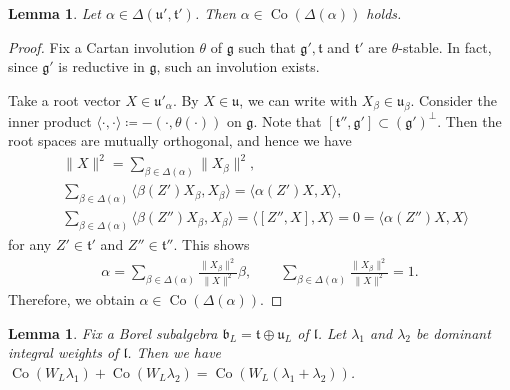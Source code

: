 \documentclass[pdftex]{sigma}
\numberwithin{equation}{section}
\newtheorem{Lemma}[Theorem]{Lemma}
\theoremstyle{definition}
\newcommand{\lie}[1]{\mathfrak{#1}}
\DeclareMathOperator{\Co}{\mathrm{Co}}
\begin{document}
\begin{Lemma}\label{lem:ConvexityRestriction}
	Let $\alpha \in \Delta(\lie{u'}, \lie{t'})$.
	Then $\alpha \in \Co(\Delta(\alpha))$ holds.
\end{Lemma}

\begin{proof}
	Fix a Cartan involution $\theta$ of $\lie{g}$ such that
	$\lie{g}', \lie{t}$ and $\lie{t}'$ are $\theta$-stable.
	In fact, since $\lie{g}'$ is reductive in $\lie{g}$, such an involution exists.

	Take a root vector $X \in \lie{u}'_{\alpha}$.
	By $X \in \lie{u}$, we can write  with $X_{\beta} \in \lie{u}_{\beta}$.
	Consider the inner product $\langle \cdot, \cdot \rangle \coloneq -(\cdot, \theta(\cdot))$ on $\lie{g}$.
	Note that $[\lie{t''}, \lie{g'}] \subset (\lie{g}')^\perp$.
	Then the root spaces are mutually orthogonal, and hence we have
	\begin{align*}
		&\|X\|^2= \sum_{\beta \in \Delta(\alpha)} \|X_\beta\|^2, \\
		&\sum_{\beta \in \Delta(\alpha)} \langle \beta(Z')X_\beta, X_\beta\rangle= \langle \alpha(Z')X, X\rangle, \\
		&\sum_{\beta \in \Delta(\alpha)} \langle \beta(Z'')X_\beta, X_\beta\rangle= \langle [Z'', X], X\rangle = 0 = \langle \alpha(Z'')X, X\rangle
	\end{align*}
	for any $Z' \in \lie{t'}$ and $Z'' \in \lie{t''}$.
	This shows
	\begin{align*}
		\alpha = \sum_{\beta \in \Delta(\alpha)} \frac{\|X_\beta\|^2}{\|X\|^2} \beta, \qquad \sum_{\beta \in \Delta(\alpha)} \frac{\|X_\beta\|^2}{\|X\|^2} = 1.
	\end{align*}
	Therefore, we obtain $\alpha \in \Co(\Delta(\alpha))$.
\end{proof}


\begin{Lemma}\label{lem:SumConvex}
	Fix a Borel subalgebra $\lie{b}_L = \lie{t}\oplus \lie{u}_L$ of $\lie{l}$.
	Let $\lambda_1$ and $\lambda_2$ be dominant integral weights of $\lie{l}$.
	Then we have $\Co(W_{L}\lambda_1)+\Co(W_{L}\lambda_2) = \Co(W_{L}(\lambda_1+\lambda_2))$.
\end{Lemma}
	
\end{document}
